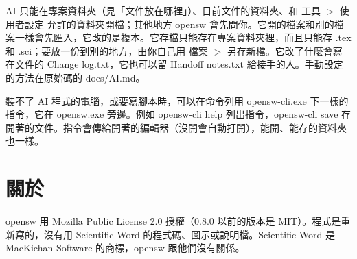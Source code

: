 AI 只能在專案資料夾（見「文件放在哪裡」）、目前文件的資料夾、和 工具 $>$ 使用者設定 允許的資料夾開檔；其他地方 opensw 會先問你。它開的檔案和別的檔案一樣會先匯入，它改的是複本。它存檔只能存在專案資料夾裡，而且只能存 .tex 和 .sci；要放一份到別的地方，由你自己用 檔案 $>$ 另存新檔。它改了什麼會寫在文件的 Change log.txt，它也可以留 Handoff notes.txt 給接手的人。手動設定的方法在原始碼的 docs/AI.md。

裝不了 AI 程式的電腦，或要寫腳本時，可以在命令列用 opensw-cli.exe 下一樣的指令，它在 opensw.exe 旁邊。例如 opensw-cli help 列出指令，opensw-cli save 存開著的文件。指令會傳給開著的編輯器（沒開會自動打開），能開、能存的資料夾也一樣。

\section{關於}

opensw 用 Mozilla Public License 2.0 授權（0.8.0 以前的版本是 MIT）。程式是重新寫的，沒有用 Scientific Word 的程式碼、圖示或說明檔。Scientific Word 是 MacKichan Software 的商標，opensw 跟他們沒有關係。
